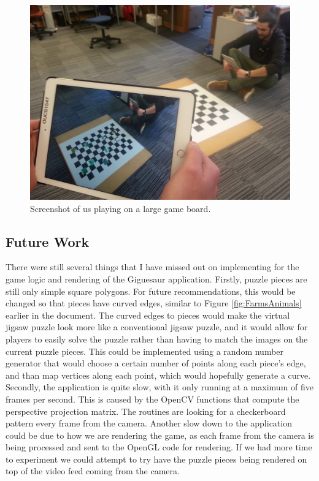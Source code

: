 \documentclass{article}
\begin{document}
\begin{figure}[ht]
\begin{center}
\includegraphics[width=1\textwidth]{images/BigBoardImage}
\caption{Screenshot of us playing on a large game board.}
\label{fig:BigGameBoard}
\end{center}
\end{figure}

\subsection{Future Work}
There were still several things that I have missed out on implementing for the
game logic and rendering of the Giguesaur application. Firstly, puzzle pieces
are still only simple square polygons. For future recommendations, this would be
changed so that pieces have curved edges, similar to Figure
\ref{fig:FarmsAnimals} earlier in the document. The curved edges to pieces would
make the virtual jigsaw puzzle look more like a conventional jigsaw puzzle, and
it would allow for players to easily solve the puzzle rather than having to
match the images on the current puzzle pieces. This could be implemented using a
random number generator that would choose a certain number of points along each
piece's edge, and than map vertices along each point, which would hopefully
generate a curve.\\

Secondly, the application is quite slow, with it only running at a maximum of
five frames per second. This is caused by the OpenCV functions that compute the
perspective projection matrix. The routines are looking for a checkerboard
pattern every frame from the camera. Another slow down to the application could
be due to how we are rendering the game, as each frame from the camera is being
processed and sent to the OpenGL code for rendering. If we had more time to
experiment we could attempt to try have the puzzle pieces being rendered on top
of the video feed coming from the camera.\\
\end{document}
